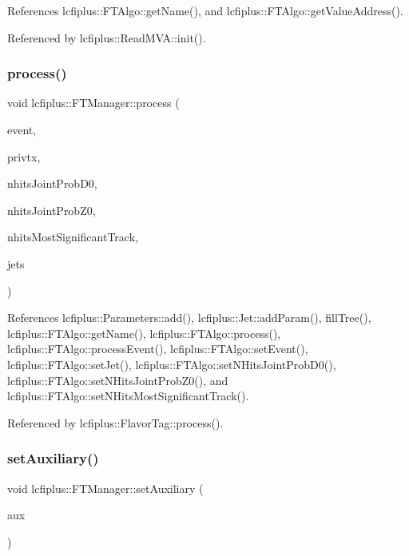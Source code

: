 References lcfiplus\+::\+F\+T\+Algo\+::get\+Name(), and lcfiplus\+::\+F\+T\+Algo\+::get\+Value\+Address().



Referenced by lcfiplus\+::\+Read\+M\+V\+A\+::init().

\mbox{\label{classlcfiplus_1_1FTManager_a6b5c1f001fd8a802c21131d760a06254}} 
\subsubsection{process()}
{\footnotesize\ttfamily void lcfiplus\+::\+F\+T\+Manager\+::process (\begin{DoxyParamCaption}\item[{const \textbf{ Event} $\ast$}]{event,  }\item[{const \textbf{ Vertex} $\ast$}]{privtx,  }\item[{int}]{nhits\+Joint\+Prob\+D0,  }\item[{int}]{nhits\+Joint\+Prob\+Z0,  }\item[{int}]{nhits\+Most\+Significant\+Track,  }\item[{\textbf{ Jet\+Vec} \&}]{jets }\end{DoxyParamCaption})}



References lcfiplus\+::\+Parameters\+::add(), lcfiplus\+::\+Jet\+::add\+Param(), fill\+Tree(), lcfiplus\+::\+F\+T\+Algo\+::get\+Name(), lcfiplus\+::\+F\+T\+Algo\+::process(), lcfiplus\+::\+F\+T\+Algo\+::process\+Event(), lcfiplus\+::\+F\+T\+Algo\+::set\+Event(), lcfiplus\+::\+F\+T\+Algo\+::set\+Jet(), lcfiplus\+::\+F\+T\+Algo\+::set\+N\+Hits\+Joint\+Prob\+D0(), lcfiplus\+::\+F\+T\+Algo\+::set\+N\+Hits\+Joint\+Prob\+Z0(), and lcfiplus\+::\+F\+T\+Algo\+::set\+N\+Hits\+Most\+Significant\+Track().



Referenced by lcfiplus\+::\+Flavor\+Tag\+::process().

\mbox{\label{classlcfiplus_1_1FTManager_acfe28cf6673eea93ca877cd6e16e901a}} 
\subsubsection{set\+Auxiliary()}
{\footnotesize\ttfamily void lcfiplus\+::\+F\+T\+Manager\+::set\+Auxiliary (\begin{DoxyParamCaption}\item[{double}]{aux }\end{DoxyParamCaption})\hspace{0.3cm}{\ttfamily [inline]}}



